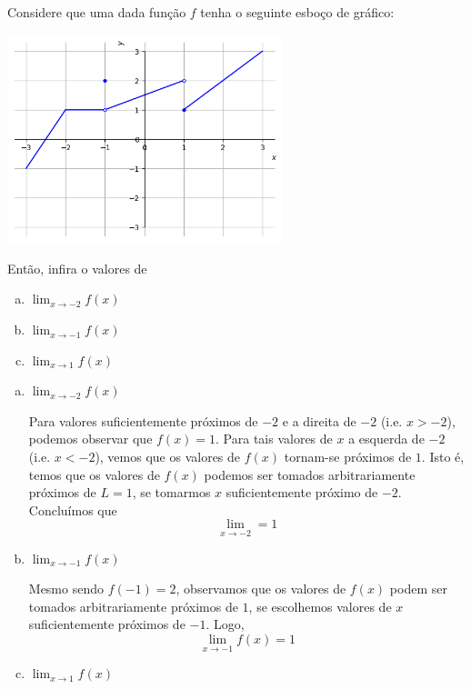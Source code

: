 \cleardoublepage\documentclass[../main.tex]{subfiles}
\begin{document}
\begin{exeresol}
  Considere que uma dada função $f$ tenha o seguinte esboço de gráfico:

  \begin{center}
    \includegraphics[width=0.6\textwidth]{fig_lim/fig_exeresol_nocaolim}
  \end{center}

  Então, infira o valores de
  \begin{multicols}{3}
  \begin{enumerate}[a)]
  \item $\displaystyle \lim_{x\to -2} f(x)$
  \item $\displaystyle \lim_{x\to -1} f(x)$
  \item $\displaystyle \lim_{x\to 1} f(x)$
  \end{enumerate}\end{multicols}
  \begin{resol}
  \begin{enumerate}[a)]
  \item $\displaystyle \lim_{x\to -2} f(x)$

    Para valores suficientemente próximos de $-2$ e a direita de $-2$ (i.e. $x>-2$), podemos observar que $f(x)=1$. Para tais valores de $x$ a esquerda de $-2$ (i.e. $x<-2$), vemos que os valores de $f(x)$ tornam-se próximos de $1$. Isto é, temos que os valores de $f(x)$ podemos ser tomados arbitrariamente próximos de $L=1$, se tomarmos $x$ suficientemente próximo de $-2$. Concluímos que
    \begin{equation*}
      \lim_{x\to -2} = 1
    \end{equation*}
  \item $\displaystyle \lim_{x\to -1} f(x)$

    Mesmo sendo $f(-1)=2$, observamos que os valores de $f(x)$ podem ser tomados arbitrariamente próximos de $1$, se escolhemos valores de $x$ suficientemente próximos de $-1$. Logo,
    \begin{equation*}
      \lim_{x\to -1} f(x) = 1
    \end{equation*}
    \item $\displaystyle \lim_{x\to 1} f(x)$


\end{enumerate}
\end{resol}
\end{exeresol}
\end{document}
